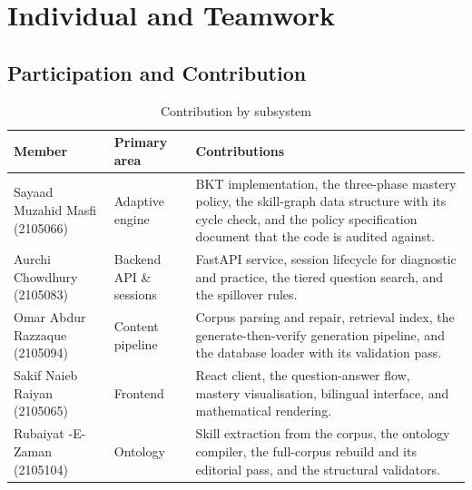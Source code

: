 \section{Individual and Teamwork}
\label{sec:team}

\subsection{Participation and Contribution}
\label{sec:participation}


\begin{table}[htbp]
  \centering
  \caption{Contribution by subsystem}
  \label{tab:contributions}
  \begin{tabularx}{\textwidth}{>{\hsize}Y>{\hsize}Y>{\hsize}Y}
    \toprule
    Member & Primary area & Contributions \\
    \midrule
    Sayaad Muzahid Masfi (2105066) & Adaptive engine & BKT implementation, the three-phase mastery policy, the skill-graph data structure with its cycle check, and the policy specification document that the code is audited against. \\
    Aurchi Chowdhury (2105083) & Backend API \& sessions & FastAPI service, session lifecycle for diagnostic and practice, the tiered question search, and the spillover rules. \\
    Omar Abdur Razzaque (2105094) & Content pipeline & Corpus parsing and repair, retrieval index, the generate-then-verify generation pipeline, and the database loader with its validation pass. \\
    Sakif Naieb Raiyan (2105065) & Frontend & React client, the question-answer flow, mastery visualisation, bilingual interface, and mathematical rendering. \\
    Rubaiyat -E- Zaman (2105104) & Ontology & Skill extraction from the corpus, the ontology compiler, the full-corpus rebuild and its editorial pass, and the structural validators. \\
    \bottomrule
  \end{tabularx}
\end{table}

